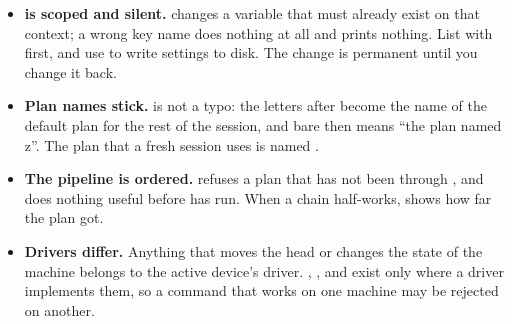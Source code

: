 \begin{itemize}[leftmargin=1.4em]
  \item \textbf{ is scoped and silent.}  changes a variable that must already exist on that context; a
        wrong key name does nothing at all and prints nothing. List with
         first, and use  to write settings to
        disk. The change is permanent until you change it back.
  \item \textbf{Plan names stick.}  is not a typo: the letters after
         become the name of the default plan for the rest of the
        session, and bare  then means ``the plan named z''. The plan
        that a fresh session uses is named .
  \item \textbf{The pipeline is ordered.}  refuses a plan that has not
        been through , and  does nothing useful before
         has run. When a chain half-works,  shows how
        far the plan got.
  \item \textbf{Drivers differ.} Anything that moves the head or changes the state
        of the machine belongs to the active device's driver. ,
        ,  and  exist only where a driver
        implements them, so a command that works on one machine may be rejected
        on another.
\end{itemize}
